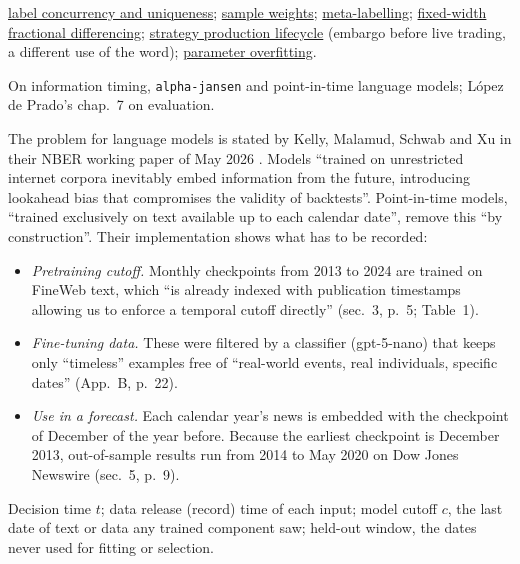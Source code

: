 \begin{qfpitfall}
 \hyperref[def:label-concurrency-uniqueness]{label concurrency and uniqueness}; \hyperref[meth:sample-weights-attribution-decay]{sample weights}; \hyperref[meth:meta-labelling]{meta-labelling}; \hyperref[meth:fixed-width-fractional-differencing]{fixed-width fractional differencing}; \hyperref[meth:strategy-production-lifecycle]{strategy production lifecycle} (embargo before live trading, a different use of the word); \hyperref[pit:parameter-overfitting]{parameter overfitting}.

 On information timing, \nolinkurl{alpha-jansen} and point-in-time language models; López de Prado's chap.~7 on evaluation.

\end{qfpitfall}

\begin{qfmethod}\label{meth:time-valid-ml-experiment-record}
 The problem for language models is stated by Kelly, Malamud, Schwab and Xu in their NBER working paper of May 2026 \citep[WP~35247, abstract, p.~1]{latest-pit-language-models}. Models ``trained on unrestricted internet corpora inevitably embed information from the future, introducing lookahead bias that compromises the validity of backtests''. Point-in-time models, ``trained exclusively on text available up to each calendar date'', remove this ``by construction''. Their implementation shows what has to be recorded:
\begin{itemize}
\item \emph{Pretraining cutoff.} Monthly checkpoints from 2013 to 2024 are trained on FineWeb text, which ``is already indexed with publication timestamps allowing us to enforce a temporal cutoff directly'' (sec.~3, p.~5; Table~1).
\item \emph{Fine-tuning data.} These were filtered by a classifier (gpt-5-nano) that keeps only ``timeless'' examples free of ``real-world events, real individuals, specific dates'' (App.~B, p.~22).
\item \emph{Use in a forecast.} Each calendar year's news is embedded with the checkpoint of December of the year before. Because the earliest checkpoint is December 2013, out-of-sample results run from 2014 to May 2020 on Dow Jones Newswire (sec.~5, p.~9).
\end{itemize}

 Decision time $t$; data release (record) time of each input; model cutoff $c$, the last date of text or data any trained component saw; held-out window, the dates never used for fitting or selection.


\end{qfmethod}
